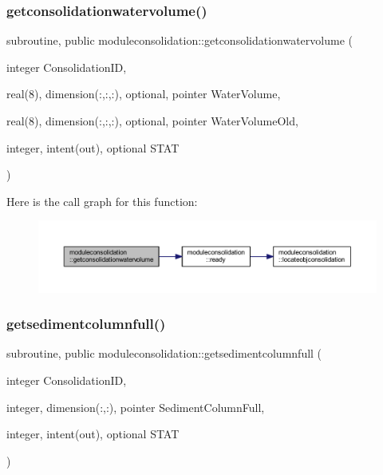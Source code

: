 \subsubsection{\texorpdfstring{getconsolidationwatervolume()}{getconsolidationwatervolume()}}
{\footnotesize\ttfamily subroutine, public moduleconsolidation\+::getconsolidationwatervolume (\begin{DoxyParamCaption}\item[{integer}]{Consolidation\+ID,  }\item[{real(8), dimension(\+:,\+:,\+:), optional, pointer}]{Water\+Volume,  }\item[{real(8), dimension(\+:,\+:,\+:), optional, pointer}]{Water\+Volume\+Old,  }\item[{integer, intent(out), optional}]{S\+T\+AT }\end{DoxyParamCaption})}

Here is the call graph for this function\+:\nopagebreak
\begin{figure}[H]
\begin{center}
\leavevmode
\includegraphics[width=350pt]{namespacemoduleconsolidation_a26b0c6595143115c8e9db2d46e42ba05_cgraph}
\end{center}
\end{figure}
\mbox{\label{namespacemoduleconsolidation_ae9552437552ade51a4c1aefcb033a0e7}} 
\subsubsection{\texorpdfstring{getsedimentcolumnfull()}{getsedimentcolumnfull()}}
{\footnotesize\ttfamily subroutine, public moduleconsolidation\+::getsedimentcolumnfull (\begin{DoxyParamCaption}\item[{integer}]{Consolidation\+ID,  }\item[{integer, dimension(\+:,\+:), pointer}]{Sediment\+Column\+Full,  }\item[{integer, intent(out), optional}]{S\+T\+AT }\end{DoxyParamCaption})}

